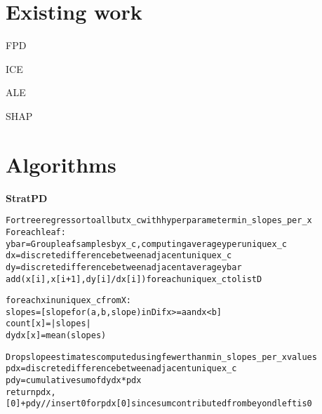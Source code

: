 \documentclass{article}
\begin{document}
\section{Existing work}

FPD

ICE

ALE

SHAP
\pagebreak
\section{Algorithms}

{\bf StratPD}\begin{alltt}\small
For tree regressor to all but x_c with hyper parameter min_slopes_per_x
For each leaf:
    y bar = Group leaf samples by x_c, computing average y per unique x_c
    dx = discrete difference between adjacent unique x_c
    dy = discrete difference between adjacent average y bar
    add (x[i], x[i+1], dy[i]/dx[i]) for each unique x_c to list D

for each x in unique x_c from X:
    slopes = [slope for (a, b, slope) in D if x >= a and x < b]
    count[x] = |slopes|
    dydx[x] = mean(slopes)

Drop slope estimates computed using fewer than min_slopes_per_x values
pdx = discrete difference between adjacent unique x_c
pdy = cumulative sum of dydx * pdx
return pdx, [0]+pdy  // insert 0 for pdx[0] since sum contributed from beyond left is 0
\end{alltt}
\end{document}
